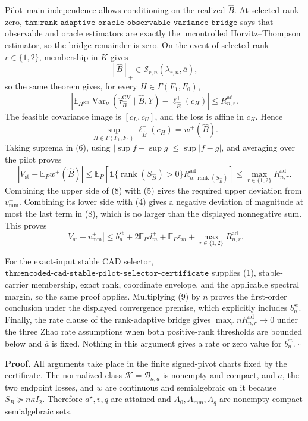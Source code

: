 Pilot--main independence allows conditioning on the realized \(\widehat B\).  At selected rank zero, \(\texttt{thm:rank-adaptive-oracle-observable-variance-bridge}\) says that observable and oracle estimators are exactly the uncontrolled Horvitz--Thompson estimator, so the bridge remainder is zero.  On the event of selected rank \(r\in\{1,2\}\), membership in \(K\) gives
\[
[\widehat B]_+\in\mathcal S_{r,n}(\lambda_{r,n},\overline a),
\]
so the same theorem gives, for every \(H\in\Gamma(F_1,F_0)\),
\[
\left|
\mathbb E_{H^{\otimes n}}
\operatorname{Var}_\nu(\widehat\tau_{\widehat B}^{\mathrm{CV}}\mid\widehat B,Y)
-\ell_{\widehat B}^+(c_H)\right|
\le R_{n,r}^{\mathrm{ad}}.
\tag{6}
\]
The feasible covariance image is \([c_L,c_U]\), and the loss is affine in \(c_H\).  Hence
\[
\sup_{H\in\Gamma(F_1,F_0)}\ell_{\widehat B}^+(c_H)
=w^+(\widehat B).
\tag{7}
\]
Taking suprema in (6), using \(|\sup f-\sup g|\le\sup|f-g|\), and averaging over the pilot proves
\[
\left|V_{\mathrm{st}}-\mathbb E_Pw^+(\widehat B)\right|
\le\mathbb E_P\!\left[
\mathbf1\{\operatorname{rank}(S_{\widehat B})>0\}
R_{n,\operatorname{rank}(S_{\widehat B})}^{\mathrm{ad}}\right]
\le\max_{r\in\{1,2\}}R_{n,r}^{\mathrm{ad}}.
\tag{8}
\]
Combining the upper side of (8) with (5) gives the required upper deviation from \(v_{\mathrm{mm}}^+\).  Combining its lower side with (4) gives a negative deviation of magnitude at most the last term in (8), which is no larger than the displayed nonnegative sum.  This proves
\[
\left|V_{\mathrm{st}}-v_{\mathrm{mm}}^+\right|
\le b_n^{\mathrm{st}}+2\mathbb E_Pd_m^+
+\mathbb E_P\varepsilon_m
+\max_{r\in\{1,2\}}R_{n,r}^{\mathrm{ad}}.
\tag{9}
\]

For the exact-input stable CAD selector, \(\texttt{thm:encoded-cad-stable-pilot-selector-certificate}\) supplies (1), stable-carrier membership, exact rank, coordinate envelope, and the applicable spectral margin, so the same proof applies.  Multiplying (9) by \(n\) proves the first-order conclusion under the displayed convergence premise, which explicitly includes \(b_n^{\mathrm{st}}\).  Finally, the rate clause of the rank-adaptive bridge gives \(\max_r nR_{n,r}^{\mathrm{ad}}\to0\) under the three Zhao rate assumptions when both positive-rank thresholds are bounded below and \(\overline a\) is fixed.  Nothing in this argument gives a rate or zero value for \(b_n^{\mathrm{st}}\). \(\square\)

\textbf{Proof.}
All arguments take place in the finite signed-pivot charts fixed by the certificate.  The normalized class \(\mathcal K=\mathcal B_{\kappa,\overline a}\) is nonempty and compact, and \(a\), the two endpoint losses, and \(w\) are continuous and semialgebraic on it because \(S_B\succeq n\kappa I_2\).  Therefore \(a^\star,v,q\) are attained and \(A_0,A_{\mathrm{mm}},A_q\) are nonempty compact semialgebraic sets.


